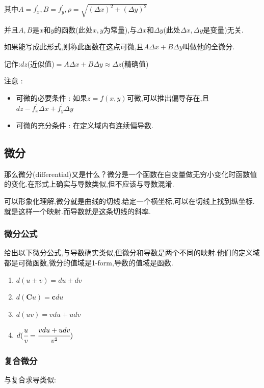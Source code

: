 \documentclass[UTF8,12pt]{ctexbook}
\newcommand{\partialDerivative}[1]{^\prime_{#1}}
\begin{document}
{{{{    其中$A = f\partialDerivative{x}, B = f\partialDerivative{y}, \rho = \sqrt{(\Delta x)^2 + (\Delta y)^2}$

    并且$A,B$是$x$和$y$的函数(此处$x,y$为常量),与$\Delta x$和$\Delta y$(此处$\Delta x, \Delta y$是变量)无关.

    如果能写成此形式,则称此函数在这点可微,且$A\Delta x + B\Delta y$叫做他的全微分.

    记作:$dz$(近似值)$= A\Delta x + B\Delta y \approx \Delta z$(精确值)

    注意 :

    \begin{itemize}
      \item 可微的必要条件 : 如果$z = f(x,y)$可微,可以推出偏导存在,且$dz - f\partialDerivative{x}\Delta x + f\partialDerivative{y}\Delta y$
      \item 可微的充分条件 : 在定义域内有连续偏导数.
    \end{itemize}
  }

}%

\subsection{微分}{
那么微分(differential)又是什么？微分是一个函数在自变量做无穷小变化时函数值的变化.在形式上确实与导数类似,但不应该与导数混淆.

可以形象化理解,微分就是曲线的切线.给定一个横坐标,可以在切线上找到纵坐标.就是这样一个映射.而导数就是这条切线的斜率.

\subsubsection{微分公式}{
  给出以下微分公式,与导数确实类似,但微分和导数是两个不同的映射.他们的定义域都是可微函数,微分的值域是1-form,导数的值域是函数.
  \begin{enumerate}
    \item $d(u \pm v) = du \pm dv$
    \item $d(\mathbf{C}u) = \mathbf{c}du$
    \item $d(uv) = vdu + udv$
    \item $d(\cfrac{u}{v} = \cfrac{vdu + udv}{v^2})$
  \end{enumerate}
}%

\subsubsection{复合微分}{
  与复合求导类似:

}}}}
\end{document}
